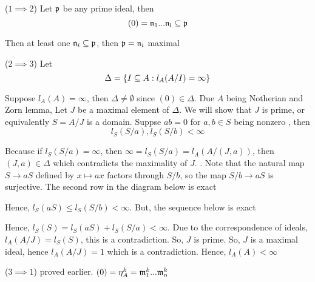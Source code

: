 \begin{longproof}
	($1 \implies 2$) Let $\mathfrak{p}$ be any prime ideal, then 
	$$
		(0) =  \mathfrak{n}_1 ... \mathfrak{n}_l \subseteq \mathfrak{p}
	$$
	
	Then at least one $\mathfrak{n}_i \subseteq \mathfrak{p}$, then $\mathfrak{p} = \mathfrak{n}_i$ maximal
	
	($2 \implies 3$) Let 
	$$
		\Delta = \{I \subseteq A: l_A(A / I) = \infty\}
	$$
	
	Suppose $l_A(A) = \infty$, then $\Delta \neq \emptyset$ since $(0) \in \Delta$. Due $A$ being Notherian and Zorn lemma, Let $J$ be a maximal element of $\Delta$. We will show that $J$ is prime, or equivalently $S = A / J$ is a domain. Suppse $ab = 0$ for $a, b \in S$ being nonzero , then 
	$$
		l_S(S / a), l_S(S / b) < \infty
	$$
	
	Because if $l_S(S / a) = \infty$, then $\infty = l_S(S / a) = l_A(A / (J, a))$, then $(J, a) \in \Delta$ which contradicts the maximality of $J$. . Note that the natural map $S \to aS$ defined by $x \mapsto ax$ factors through $S / b$, so the map $S/b \to aS$ is surjective. The second row in the diagram below is exact
	\begin{center}
	\end{center}
	
	Hence, $l_S(aS) \leq l_S(S / b) < \infty$. But, the sequence below is exact
	\begin{center}
	\end{center}
	
	Hence, $l_S(S) = l_S(aS) + l_S(S / a) < \infty$. Due to the correspondence of ideals, $l_A(A / J) = l_S(S)$, this is a contradiction. So, $J$ is prime. So, $J$ is a maximal ideal, hence $l_A(A / J) = 1$ which is a contradiction. Hence, $l_A(A) < \infty$

	($3 \implies 1$) proved earlier. $(0) = \eta_A^k = \mathfrak{m}_1^k ... \mathfrak{m}_n^k$
	
\end{longproof}

